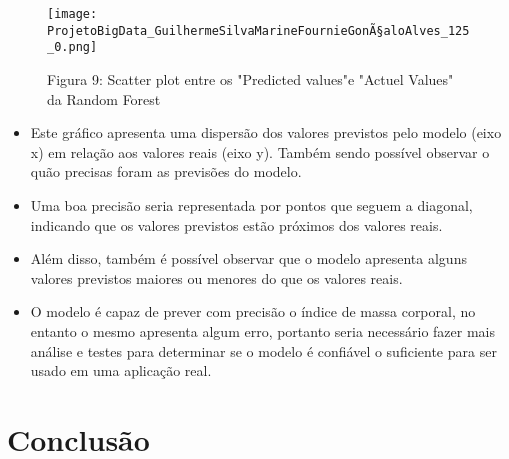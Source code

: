 \documentclass[11pt]{article}
\providecommand{\tightlist}{%
      \setlength{\itemsep}{0pt}\setlength{\parskip}{0pt}}
\begin{document}
\begin{figure}[h]
   \centering
   \texttt{[image: ProjetoBigData\_GuilhermeSilvaMarineFournieGonÃ§aloAlves\_125\_0.png]}
   \pagebreak
    \caption{Figura 9: Scatter plot entre os "Predicted values"e "Actuel Values" da Random Forest}
    \pagebreak
   \label{fig:scatterPlot2}
\end{figure}
    
    \begin{itemize}
\tightlist
\item
  Este gráfico apresenta uma dispersão dos valores previstos pelo modelo
  (eixo x) em relação aos valores reais (eixo y). Também sendo possível
  observar o quão precisas foram as previsões do modelo.
\item
  Uma boa precisão seria representada por pontos que seguem a diagonal,
  indicando que os valores previstos estão próximos dos valores reais.
\item
  Além disso, também é possível observar que o modelo apresenta alguns
  valores previstos maiores ou menores do que os valores reais.
\item
  O modelo é capaz de prever com precisão o índice de massa corporal, no
  entanto o mesmo apresenta algum erro, portanto seria necessário fazer
  mais análise e testes para determinar se o modelo é confiável o
  suficiente para ser usado em uma aplicação real.
\end{itemize}

    \hypertarget{conclusuxe3o}{%
\section{Conclusão}\label{conclusuxe3o}}
\end{document}

